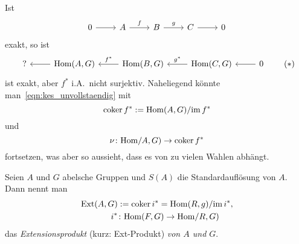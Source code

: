Ist
\begin{equation*}
  \begin{tikzcd}
    0 \arrow{r}{}
      & A \arrow{r}{f}
      & B \arrow{r}{g}
      & C \arrow{r}{}
      & 0
  \end{tikzcd}
\end{equation*}
exakt, so ist
\begin{equation*}
  \begin{tikzcd}[arrows=leftarrow]
    ? \arrow{r}{}
      & \Hom(A,G) \arrow{r}{f^*}
      & \Hom(B,G) \arrow{r}{g^*}
      & \Hom(C,G) \arrow{r}{}
      & 0
  \end{tikzcd}
  \tag{$*$}\label{eqn:kes_unvollstaendig}
\end{equation*}
ist exakt, aber $f^*$ i.A.\ nicht surjektiv.
Naheliegend könnte man~\eqref{eqn:kes_unvollstaendig} mit
\begin{equation*}
  \operatorname{coker} f^* := \mathrm{Hom}(A,G) / {\operatorname{im} f^*}
\end{equation*}
und
\begin{equation*}
  \nu\colon \mathrm{Hom}/A,G) \to \operatorname{coker} f^*
\end{equation*}
fortsetzen, was aber so aussieht, dass es von zu vielen Wahlen abhängt.
\begin{defn}
  Seien $A$ und $G$ abelsche Gruppen und $S(A)$ die Standardauflösung von $A$.
  Dann nennt man
  \begin{align*}
    \mathrm{Ext}(A,G) &:= \operatorname{coker} i^* = \mathrm{Hom}(R,g) / {\operatorname{im} i^*}, \\
    i^* & \colon \mathrm{Hom}(F,G) \to \mathrm{Hom}/R,G)
  \end{align*}
  das \emph{Extensionsprodukt} (kurz: Ext-Produkt) \emph{von $A$ und $G$}.
\end{defn}
